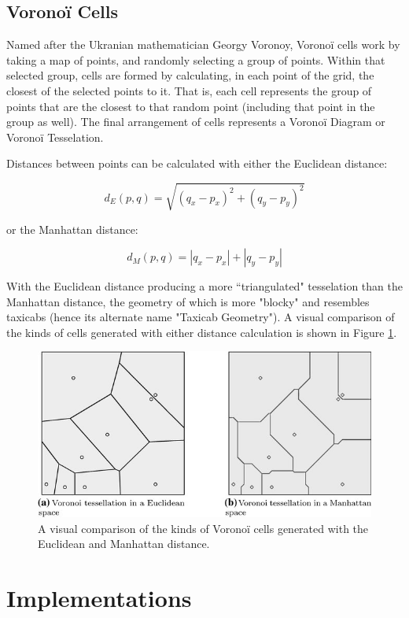\subsection{Voronoï Cells}

Named after the Ukranian mathematician Georgy Voronoy, Voronoï cells work by taking a map of points, and randomly selecting a group of points. Within that selected group, cells are formed by calculating, in each point of the grid, the closest of the selected points to it. That is, each cell represents the group of points that are the closest to that random point (including that point in the group as well). The final arrangement of cells represents a Voronoï Diagram or Voronoï Tesselation.

Distances between points can be calculated with either the Euclidean distance:

$$ d_{E}(p, q) = \sqrt{(q_x - p_x)^2 + (q_y - p_y)^2} $$

or the Manhattan distance:

$$ d_{M}(p, q) = |q_x - p_x| + |q_y - p_y| $$

With the Euclidean distance producing a more ``triangulated" tesselation than the Manhattan distance, the geometry of which is more "blocky" and resembles taxicabs (hence its alternate name "Taxicab Geometry"). A visual comparison of the kinds of cells generated with either distance calculation is shown in Figure \ref{fig:voronoicomparison}.

\begin{figure}[H]
    \centering
    \includegraphics{Images/Voronoitessellations.jpg}
    \caption{A visual comparison of the kinds of Voronoï cells generated with the Euclidean and Manhattan distance.\cite{reffortesselations}}
    \label{fig:voronoicomparison}
\end{figure}

\section{Implementations}

